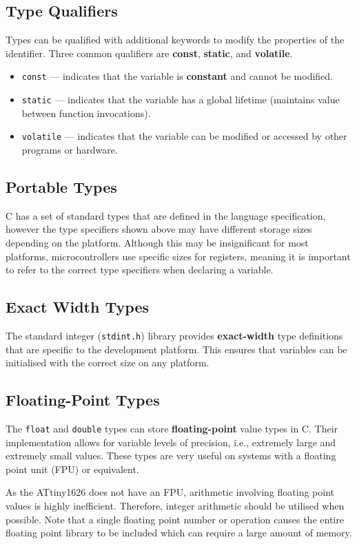 \documentclass[a4paper]{report}
\begin{document}
\subsection{Type Qualifiers}
Types can be qualified with additional keywords to modify the
properties of the identifier. Three common qualifiers are
\textbf{const}, \textbf{static}, and \textbf{volatile}.
\begin{itemize}
    \item \texttt{const} --- indicates that the variable is \textbf{constant} and cannot be modified.
    \item \texttt{static} --- indicates that the variable has a global lifetime (maintains value between function invocations).
    \item \texttt{volatile} --- indicates that the variable can be modified or accessed by other programs or hardware.
\end{itemize}
\subsection{Portable Types}
C has a set of standard types that are defined in the language
specification, however the type specifiers shown above may have
different storage sizes depending on the platform. Although this may be
insignificant for most platforms, microcontrollers use specific sizes
for registers, meaning it is important to refer to the correct type
specifiers when declaring a variable.
\subsection{Exact Width Types}\label{sec:exact_width_types}
The standard integer (\texttt{stdint.h}) library provides
\textbf{exact-width} type definitions that are specific to the
development platform. This ensures that variables can be initialised
with the correct size on any platform.
\subsection{Floating-Point Types}
The \texttt{float} and \texttt{double} types can store
\textbf{floating-point} value types in C. Their implementation allows
for variable levels of precision, i.e., extremely large and extremely
small values. These types are very useful on systems with a floating
point unit (FPU) or equivalent.

As the ATtiny1626 does not have an FPU, arithmetic involving floating
point values is highly inefficient. Therefore, integer arithmetic
should be utilised when possible. Note that a single floating point
number or operation causes the entire floating point library to be
included which can require a large amount of memory.
\end{document}
